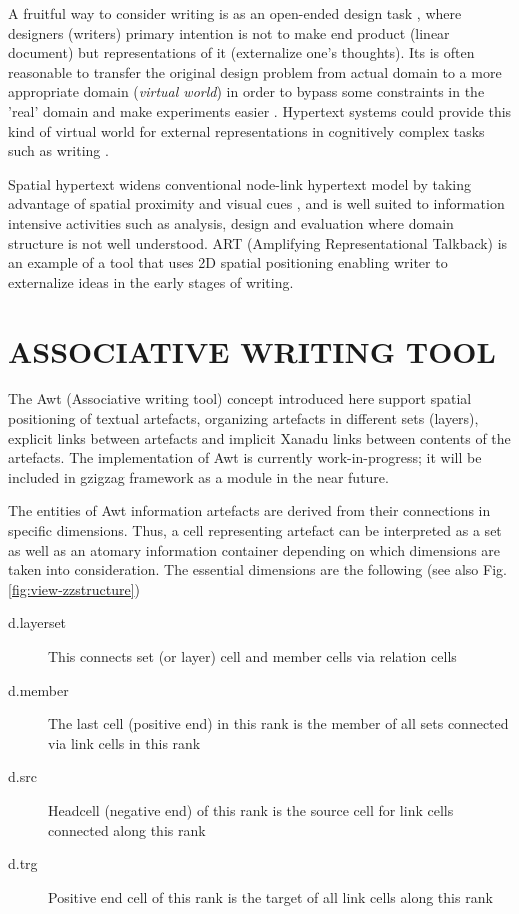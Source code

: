 A fruitful way to consider writing is as an open-ended design task 
\cite{neuwirth89external-representations-in-writing},
where designers (writers) primary intention is not to make end product 
(linear document) but representations of it (externalize one's thoughts). 
Its is often reasonable to transfer the 
original design problem from actual domain to a more appropriate domain
({\em virtual world}) in order to bypass some constraints in the 'real' domain 
and make experiments easier \cite{schoen83reflection-in-on-action}.
Hypertext systems could provide this kind of virtual world for external
representations in cognitively complex tasks 
\cite{as-we-may-think, engelbart63conceptual-framework-augmenting-mans-intellect}
such as writing \cite{neuwirth89external-representations-in-writing}. 

Spatial hypertext widens conventional node-link hypertext model by 
taking advantage of spatial proximity and visual 
cues \cite{shipman-marshall00spatial-hypertext-alternative}, 
and is well suited to information intensive activities such as analysis, 
design and evaluation where domain 
structure is not well understood. ART (Amplifying Representational
Talkback) \cite{nakakoji00spatial-positioning} is an example of a tool 
that uses 2D spatial positioning enabling writer to externalize ideas in 
the early stages of writing. 

\section{ASSOCIATIVE WRITING TOOL}
The Awt (Associative writing tool) concept introduced here 
support spatial positioning of textual artefacts, organizing artefacts
in different sets (layers),
explicit links between artefacts and implicit Xanadu links between
contents of the artefacts. The implementation of Awt is currently 
work-in-progress; it will be included in gzigzag framework as a module in 
the near future. 

The entities of Awt information artefacts are derived from their 
connections in specific dimensions. Thus, a cell representing artefact 
can be interpreted as a set as well as an atomary information container 
depending on which dimensions are taken into consideration. The essential 
dimensions are the following (see also Fig. \ref{fig:view-zzstructure})
\begin{description}
\item[d.layerset] This connects set (or layer) cell and member cells via 
relation cells
\item[d.member] The last cell (positive end) in this rank is the member of
all sets connected via link cells in this rank 
\item[d.src] Headcell (negative end) of this rank is the source cell for
link cells connected along this rank
\item[d.trg] Positive end cell of this rank is the target of all link cells
along this rank
\end{description}


